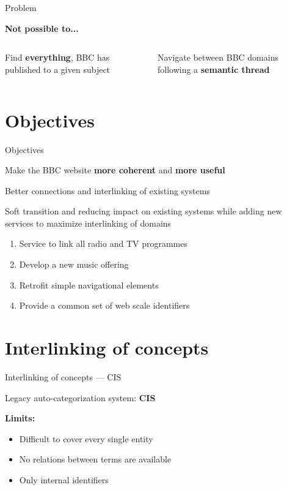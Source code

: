 \documentclass[10pt]{beamer}
\begin{document}
\begin{frame}[fragile]{Problem}

  \alert{\textbf{Not possible to...}}
  \bigskip

  \begin{columns}[T,onlytextwidth]
      Find \textbf{everything}, BBC has published to a given subject

      Navigate between BBC domains following a \textbf{semantic thread}
  \end{columns}


\end{frame}


\section{Objectives}

\begin{frame}[fragile]{Objectives}

  Make the BBC website \alert{\textbf{more coherent}} and \alert{\textbf{more useful}}
  \bigskip

  \pause
  Better connections and interlinking of existing systems

  Soft transition and reducing impact on existing systems while adding new services to maximize interlinking of domains

  \pause
  \begin{enumerate}[<+->]
    \item \alert<7>{Service to link all radio and TV programmes}
    \item Develop a new music offering
    \item Retrofit simple navigational elements
    \item \alert<7>{Provide a common set of web scale identifiers}
  \end{enumerate}

\end{frame}


\section{Interlinking of concepts}

\begin{frame}[fragile]{Interlinking of concepts — CIS}

  Legacy auto-categorization system: {\textbf{CIS}}


  \bigskip
  \alert{\textbf{Limits:}}

  \begin{itemize}
    \item Difficult to cover every single entity
    \item No relations between terms are available
    \item Only internal identifiers
  \end{itemize}

\end{frame}
\end{document}
